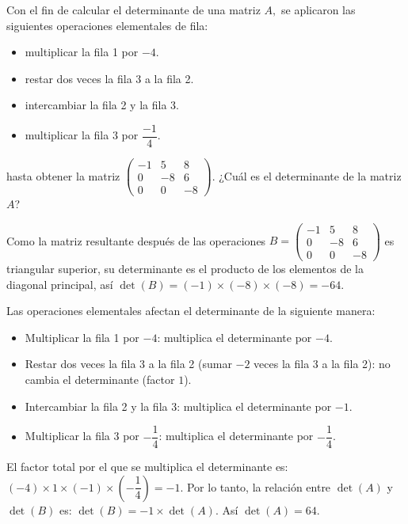 \begin{prob}
Con el fin de calcular el determinante de una matriz $A,$ se aplicaron las siguientes operaciones elementales de fila:
\begin{itemize}
\item multiplicar la fila 1 por $-4.$
\item restar dos veces la fila 3 a la fila 2.
\item intercambiar la fila 2 y la fila 3.
\item multiplicar la fila 3 por $\dfrac{-1}{4}.$
\end{itemize}
hasta obtener la matriz $\begin{pmatrix} -1&5&8\\0&-8&6\\0&0&-8 \end{pmatrix}.$ ¿Cuál es el determinante de la matriz $A$?
\begin{myproof} Como la matriz resultante después de las operaciones $
B = \begin{pmatrix} -1 & 5 & 8 \\ 0 & -8 & 6 \\ 0 & 0 & -8 \end{pmatrix}$ es triangular superior, su determinante es el producto de los elementos de la diagonal principal, así $
\det(B) = (-1) \times (-8) \times (-8) = -64.$

Las operaciones elementales afectan el determinante de la siguiente manera:
\begin{itemize}
\item Multiplicar la fila 1 por $-4$: multiplica el determinante por $-4$.
\item Restar dos veces la fila 3 a la fila 2 (sumar $-2$ veces la fila 3 a la fila 2): no cambia el determinante (factor $1$).
\item Intercambiar la fila 2 y la fila 3: multiplica el determinante por $-1$.
\item Multiplicar la fila 3 por $-\dfrac{1}{4}$: multiplica el determinante por $-\dfrac{1}{4}$.
\end{itemize}

El factor total por el que se multiplica el determinante es: $
(-4) \times 1 \times (-1) \times \left(-\dfrac{1}{4}\right) = -1.$ Por lo tanto, la relación entre $\det(A)$ y $\det(B)$ es: $ 
\det(B) = -1 \times \det(A).$ Así $ \det(A) = 64.$
\end{myproof}
\end{prob}

